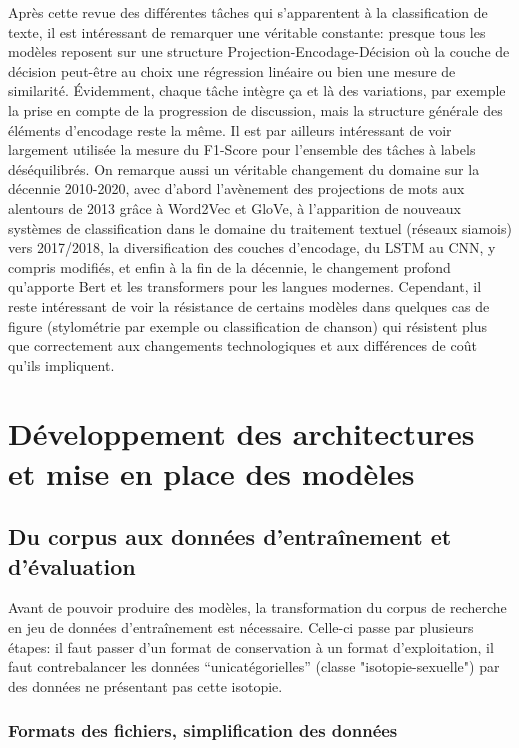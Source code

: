 Après cette revue des différentes tâches qui s'apparentent à la classification de texte, il est intéressant de remarquer une véritable constante: presque tous les modèles reposent sur une structure Projection-Encodage-Décision où la couche de décision peut-être au choix une régression linéaire ou bien une mesure de similarité. Évidemment, chaque tâche intègre ça et là des variations, par exemple la prise en compte de la progression de discussion, mais la structure générale des éléments d'encodage reste la même. Il est par ailleurs intéressant de voir largement utilisée la mesure du F1-Score pour l'ensemble des tâches à labels déséquilibrés. On remarque aussi un véritable changement du domaine sur la décennie 2010-2020, avec  d'abord l'avènement des projections de mots aux alentours de 2013 grâce à Word2Vec et GloVe, à l'apparition de nouveaux systèmes de classification dans le domaine du traitement textuel (réseaux siamois) vers 2017/2018, la diversification des couches d'encodage, du LSTM au CNN, y compris modifiés, et enfin à la fin de la décennie, le changement profond qu'apporte Bert et les transformers pour les langues modernes. Cependant, il reste intéressant de voir la résistance de certains modèles dans quelques cas de figure (stylométrie par exemple ou classification de chanson) qui résistent plus que correctement aux changements technologiques et aux différences de coût qu'ils impliquent.



\section{Développement des architectures et mise en place des modèles}

\subsection{Du corpus aux données d'entraînement et d'évaluation}

Avant de pouvoir produire des modèles, la transformation du corpus de recherche en jeu de données d'entraînement est nécessaire. Celle-ci passe par plusieurs étapes: il faut passer d'un format de conservation à un format d'exploitation, il faut contrebalancer les données \enquote{unicatégorielles} (classe "isotopie-sexuelle") par des données ne présentant pas cette isotopie.

\subsubsection{Formats des fichiers, simplification des données}

